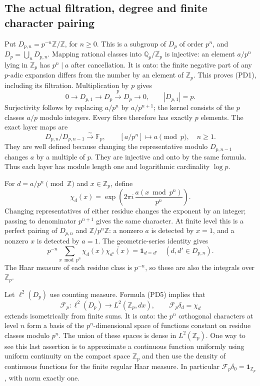 \documentclass[11pt,a4paper]{article}
\theoremstyle{definition}\newtheorem{definition}[theorem]{Definition}
\newcommand{\Z}{\mathbb Z}\newcommand{\Q}{\mathbb Q}
\newcommand{\F}{\mathbb F}
\begin{document}
\subsection{The actual filtration, degree and finite character pairing}
Put $D_{p,n}=p^{-n}\Z/\Z$, for $n\ge0$. This is a subgroup of
$D_p$ of order $p^n$, and $D_p=\bigcup_nD_{p,n}$. Mapping rational
classes into $\Q_p/\Z_p$ is injective: an element $a/p^n$ lying in
$\Z_p$ has $p^n\mid a$ after cancellation. It is onto: the finite
negative part of any $p$-adic expansion differs from the number by an
element of $\Z_p$. This proves (PD1), including its filtration.
Multiplication by $p$ gives
\[
 0\longrightarrow D_{p,1}\longrightarrow D_p
 \xrightarrow{p}D_p\longrightarrow0,
 \qquad |D_{p,1}|=p.
 \tag{PD2}
\]
Surjectivity follows by replacing $a/p^n$ by $a/p^{n+1}$; the kernel
consists of the $p$ classes $a/p$ modulo integers. Every fibre therefore
has exactly $p$ elements. The exact layer maps are
\[
 D_{p,n}/D_{p,n-1}\xrightarrow{\sim}\F_p,
 \qquad [a/p^n]\longmapsto a\pmod p,\quad n\ge1.
 \tag{PD3}
\]
They are well defined because changing the representative modulo
$D_{p,n-1}$ changes $a$ by a multiple of $p$. They are injective and
onto by the same formula. Thus each layer has module length one and
logarithmic cardinality $\log p$.

For $d=a/p^n\pmod\Z$ and $x\in\Z_p$, define
\[
 \chi_d(x)=\exp\left(2\pi i\,\frac{a(x\bmod p^n)}{p^n}\right).
 \tag{PD4}
\]
Changing representatives of either residue changes the exponent by an
integer; passing to denominator $p^{n+1}$ gives the same character.
At finite level this is a perfect pairing of $D_{p,n}$ and
$\Z/p^n\Z$: a nonzero $a$ is detected by $x=1$, and a nonzero $x$
is detected by $a=1$. The geometric-series identity gives
\[
 p^{-n}\sum_{x\bmod p^n}\chi_d(x)\overline{\chi_{d'}(x)}
 =\mathbf1_{d=d'}\quad(d,d'\in D_{p,n}).
 \tag{PD5}
\]
The Haar measure of each residue class is $p^{-n}$, so these are also
the integrals over $\Z_p$.

Let $\ell^2(D_p)$ use counting measure. Formula (PD5) implies that
\[
 \mathcal F_p:\ell^2(D_p)\longrightarrow L^2(\Z_p,dx),\qquad
 \mathcal F_p\delta_d=\chi_d
 \tag{PD6}
\]
extends isometrically from finite sums. It is onto: the $p^n$ orthogonal
characters at level $n$ form a basis of the $p^n$-dimensional space of
functions constant on residue classes modulo $p^n$. The union of these
spaces is dense in $L^2(\Z_p)$. One way to see this last assertion is
to approximate a continuous function uniformly using uniform continuity
on the compact space $\Z_p$ and then use the density of continuous
functions for the finite regular Haar measure. In particular
$\mathcal F_p\delta_0=\mathbf1_{\Z_p}$, with norm exactly one.
\end{document}
